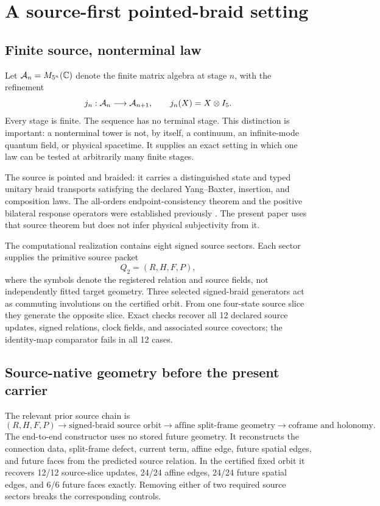 \section{A source-first pointed-braid setting}

\subsection{Finite source, nonterminal law}

Let $\mathcal{A}_n=M_{5^n}(\mathbb C)$ denote the finite matrix algebra at stage $n$, with the refinement
\begin{equation}\label{eq:refinement}
 j_n:\mathcal{A}_n\longrightarrow\mathcal{A}_{n+1},\qquad j_n(X)=X\otimes I_5.
\end{equation}
Every stage is finite. The sequence has no terminal stage. This distinction is important: a nonterminal tower is not, by itself, a continuum, an infinite-mode quantum field, or physical spacetime. It supplies an exact setting in which one law can be tested at arbitrarily many finite stages.

The source is pointed and braided: it carries a distinguished state and typed unitary braid transports satisfying the declared Yang--Baxter, insertion, and composition laws. The all-orders endpoint-consistency theorem and the positive bilateral response operators were established previously \cite{watanabe2026braid}. The present paper uses that source theorem but does not infer physical subjectivity from it.

The computational realization contains eight signed source sectors. Each sector supplies the primitive source packet
\begin{equation}\label{eq:sourcepacket}
 Q_2=(R,H,F,P),
\end{equation}
where the symbols denote the registered relation and source fields, not independently fitted target geometry. Three selected signed-braid generators act as commuting involutions on the certified orbit. From one four-state source slice they generate the opposite slice. Exact checks recover all 12 declared source updates, signed relations, clock fields, and associated source covectors; the identity-map comparator fails in all 12 cases.

\subsection{Source-native geometry before the present carrier}

The relevant prior source chain is
\begin{equation}\label{eq:sourcechain}
 (R,H,F,P)
 \longrightarrow \text{signed-braid source orbit}
 \longrightarrow \text{affine split-frame geometry}
 \longrightarrow \text{coframe and holonomy}.
\end{equation}
The end-to-end constructor uses no stored future geometry. It reconstructs the connection data, split-frame defect, current term, affine edge, future spatial edges, and future faces from the predicted source relation. In the certified fixed orbit it recovers 12/12 source-slice updates, 24/24 affine edges, 24/24 future spatial edges, and 6/6 future faces exactly. Removing either of two required source sectors breaks the corresponding controls.

